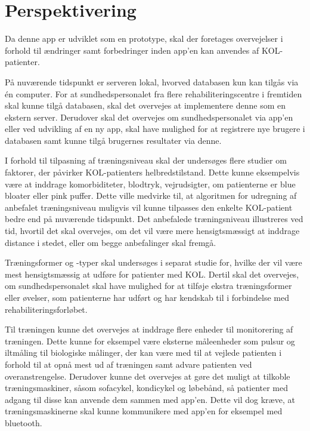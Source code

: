 \section{Perspektivering}
Da denne app er udviklet som en prototype, skal der foretages overvejelser i forhold til ændringer samt forbedringer inden app'en kan anvendes af KOL-patienter. 

På nuværende tidspunkt er serveren lokal, hvorved databasen kun kan tilgås via én computer. For at sundhedspersonalet fra flere rehabiliteringscentre i fremtiden skal kunne tilgå databasen, skal det overvejes at implementere denne som en ekstern server. Derudover skal det overvejes om sundhedspersonalet via app’en eller ved udvikling af en ny app, skal have mulighed for at registrere nye brugere i databasen samt kunne tilgå brugernes resultater via denne.  

I forhold til tilpasning af træningsniveau skal der undersøges flere studier om faktorer, der påvirker KOL-patienters helbredstilstand. Dette kunne eksempelvis være at inddrage komorbiditeter, blodtryk, vejrudsigter, om patienterne er blue bloater eller pink puffer. Dette ville medvirke til, at algoritmen for udregning af anbefalet træningsniveau muligvis vil kunne tilpasses den enkelte KOL-patient bedre end på nuværende tidspunkt. Det anbefalede træningsniveau illustreres ved tid, hvortil det skal overvejes, om det vil være mere hensigtsmæssigt at inddrage distance i stedet, eller om begge anbefalinger skal fremgå. 

Træningsformer og -typer skal undersøges i separat studie for, hvilke der vil være mest hensigtsmæssig at udføre for patienter med KOL. Dertil skal det overvejes, om sundhedspersonalet skal have mulighed for at tilføje ekstra træningsformer eller øvelser, som patienterne har udført og har kendskab til i forbindelse med rehabiliteringsforløbet.

Til træningen kunne det overvejes at inddrage flere enheder til monitorering af træningen. Dette kunne for eksempel være eksterne måleenheder som pulsur og iltmåling til biologiske målinger, der kan være med til at vejlede patienten i forhold til at opnå mest ud af træningen samt advare patienten ved overanstrengelse. Derudover kunne det overvejes at gøre det muligt at tilkoble træningsmaskiner, såsom sofacykel, kondicykel og løbebånd, så patienter med adgang til disse kan anvende dem sammen med app’en. Dette vil dog kræve, at træningsmaskinerne skal kunne kommunikere med app’en for eksempel med bluetooth. 

